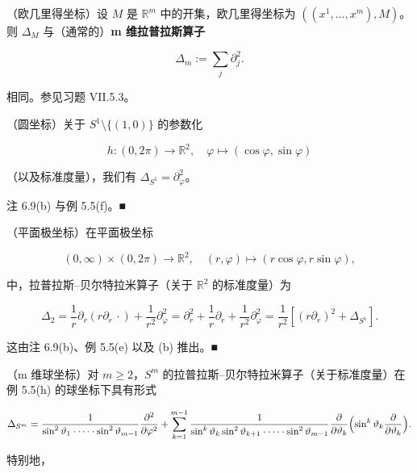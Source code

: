 
\begin{example}

\begin{items}
\item

（欧几里得坐标）设 $ M $ 是 $ \mathbb{R}^m $ 中的开集，欧几里得坐标为 $ ((x^1,\ldots,x^m),M) $。则 $ \Delta_M $ 与（通常的）\textbf{m 维拉普拉斯算子}

\[
\Delta_{m} := \sum_{j}\partial_{j}^{2}.
\]

相同。参见习题 VII.5.3。

\item

（圆坐标）关于 $ S^1\setminus\{(1,0)\} $ 的参数化

\[
h: (0,2\pi) \to \mathbb{R}^{2}, \quad \varphi \mapsto (\cos\varphi, \sin\varphi)
\]

（以及标准度量），我们有 $ \Delta_{S^1} = \partial_{\varphi}^{2} $。

\proofhead
注 6.9(b) 与例 5.5(f)。\nobreak\hspace{0.35em}■
\item

（平面极坐标）在平面极坐标

\[
(0,\infty)\times(0,2\pi) \to \mathbb{R}^{2}, \quad (r,\varphi) \mapsto (r\cos\varphi, r\sin\varphi),
\]

中，拉普拉斯–贝尔特拉米算子（关于 $ \mathbb{R}^2 $ 的标准度量）为

\[
\Delta_{2} = \frac{1}{r}\partial_{r}(r\partial_{r}\,\cdot) + \frac{1}{r^{2}}\partial_{\varphi}^{2} = \partial_{r}^{2} + \frac{1}{r}\partial_{r} + \frac{1}{r^{2}}\partial_{\varphi}^{2} = \frac{1}{r^{2}}\left[(r\partial_{r})^{2} + \Delta_{S^1}\right].
\]

\proofhead
这由注 6.9(b)、例 5.5(e) 以及 (b) 推出。\nobreak\hspace{0.35em}■
\item

（m 维球坐标）对 $ m \ge 2 $，$ S^m $ 的拉普拉斯–贝尔特拉米算子（关于标准度量）在例 5.5(h) 的球坐标下具有形式

\[
\Delta_{S^{m}} = \frac{1}{\sin^{2}\vartheta_{1}\cdot\cdots\cdot\sin^{2}\vartheta_{m-1}}\frac{\partial^{2}}{\partial\varphi^{2}} + \sum_{k=1}^{m-1}\frac{1}{\sin^{k}\vartheta_{k}\sin^{2}\vartheta_{k+1}\cdot\cdots\cdot\sin^{2}\vartheta_{m-1}}\frac{\partial}{\partial\vartheta_{k}}\Bigl(\sin^{k}\vartheta_{k}\frac{\partial}{\partial\vartheta_{k}}\Bigr).
\]

特别地，


\end{items}
\end{example}
